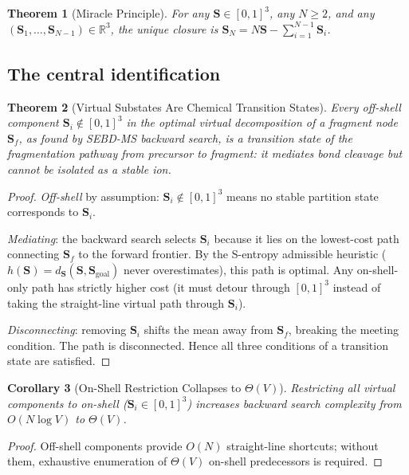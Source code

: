 \documentclass[twocolumn,10pt,a4paper]{article}
\theoremstyle{thmstyle}
\newtheorem{theorem}{Theorem}[section]
\newtheorem{corollary}[theorem]{Corollary}
\theoremstyle{definition}
\theoremstyle{remark}
\newcommand{\R}{\mathbb{R}}
\newcommand{\Sv}{\mathbf{S}}
\begin{document}
\begin{theorem}[Miracle Principle]
For any $\Sv \in [0,1]^3$, any $N \geq 2$, and any $(\Sv_1,\ldots,\Sv_{N-1})
\in \R^3$, the unique closure is $\Sv_N = N\Sv - \sum_{i=1}^{N-1}\Sv_i$.
\end{theorem}

\subsection{The central identification}

\begin{theorem}[Virtual Substates Are Chemical Transition States]
\label{thm:virtual_ts}
Every off-shell component $\Sv_i \notin [0,1]^3$ in the optimal virtual
decomposition of a fragment node $\Sv_f$, as found by SEBD-MS backward
search, is a transition state of the fragmentation pathway from precursor
to fragment: it mediates bond cleavage but cannot be isolated as a stable
ion.
\end{theorem}

\begin{proof}
\emph{Off-shell} by assumption: $\Sv_i \notin [0,1]^3$ means no stable
partition state corresponds to $\Sv_i$.

\emph{Mediating}: the backward search selects $\Sv_i$ because it lies on
the lowest-cost path connecting $\Sv_f$ to the forward frontier. By the
S-entropy admissible heuristic ($h(\Sv) = d_\Sv(\Sv,\Sv_\text{goal})$ never
overestimates), this path is optimal. Any on-shell-only path has strictly
higher cost (it must detour through $[0,1]^3$ instead of taking the
straight-line virtual path through $\Sv_i$).

\emph{Disconnecting}: removing $\Sv_i$ shifts the mean away from $\Sv_f$,
breaking the meeting condition. The path is disconnected. Hence all three
conditions of a transition state are satisfied.
\end{proof}

\begin{corollary}[On-Shell Restriction Collapses to $\Theta(V)$]
Restricting all virtual components to on-shell ($\Sv_i \in [0,1]^3$)
increases backward search complexity from $O(N\log V)$ to $\Theta(V)$.
\end{corollary}

\begin{proof}
Off-shell components provide $O(N)$ straight-line shortcuts; without them,
exhaustive enumeration of $\Theta(V)$ on-shell predecessors is required.
\end{proof}
\end{document}
